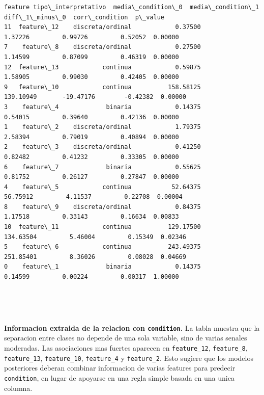 \documentclass[11pt]{article}
\begin{document}
    \begin{Verbatim}[commandchars=\\\{\}]
       feature tipo\_interpretativo  media\_condition\_0  media\_condition\_1  diff\_1\_minus\_0  corr\_condition  p\_value
11  feature\_12    discreta/ordinal            0.37500            1.37226         0.99726         0.52052  0.00000
7    feature\_8    discreta/ordinal            0.27500            1.14599         0.87099         0.46319  0.00000
12  feature\_13            continua            0.59875            1.58905         0.99030         0.42405  0.00000
9   feature\_10            continua          158.58125          139.10949       -19.47176        -0.42382  0.00000
3    feature\_4             binaria            0.14375            0.54015         0.39640         0.42136  0.00000
1    feature\_2    discreta/ordinal            1.79375            2.58394         0.79019         0.40894  0.00000
2    feature\_3    discreta/ordinal            0.41250            0.82482         0.41232         0.33305  0.00000
6    feature\_7             binaria            0.55625            0.81752         0.26127         0.27847  0.00000
4    feature\_5            continua           52.64375           56.75912         4.11537         0.22708  0.00004
8    feature\_9    discreta/ordinal            0.84375            1.17518         0.33143         0.16634  0.00833
10  feature\_11            continua          129.17500          134.63504         5.46004         0.15349  0.02346
5    feature\_6            continua          243.49375          251.85401         8.36026         0.08028  0.04669
0    feature\_1             binaria            0.14375            0.14599         0.00224         0.00317  1.00000
    \end{Verbatim}

    
    \begin{center}
    \end{center}
    { \hspace*{\fill} \\}
    
    \begin{center}
    \end{center}
    { \hspace*{\fill} \\}
    
    \textbf{Informacion extraida de la relacion con \texttt{condition}.} La
tabla muestra que la separacion entre clases no depende de una sola
variable, sino de varias senales moderadas. Las asociaciones mas fuertes
aparecen en \texttt{feature\_12}, \texttt{feature\_8},
\texttt{feature\_13}, \texttt{feature\_10}, \texttt{feature\_4} y
\texttt{feature\_2}. Esto sugiere que los modelos posteriores deberan
combinar informacion de varias features para predecir
\texttt{condition}, en lugar de apoyarse en una regla simple basada en
una unica columna.
\end{document}

